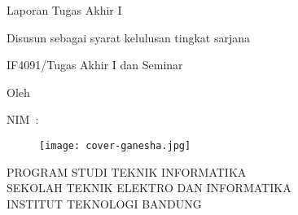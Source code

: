 
\begin{center}
    \smallskip
    \thispagestyle{empty}
    \Large \bfseries \MakeUppercase{\thetitle}
    \vfill

    \Large Laporan Tugas Akhir I
    \vfill

    \normalsize Disusun sebagai syarat kelulusan tingkat sarjana

    \normalsize IF4091/Tugas Akhir I dan Seminar
    \vfill

    \large Oleh

    \Large \uppercase{\theauthor}
    
    \Large NIM~:~\uppercase{\nim}

    \vfill
    \begin{figure}[h]
        \centering
      	\texttt{[image: cover-ganesha.jpg]}
    \end{figure}
    \vfill

    \large
    \uppercase{Program Studi Teknik Informatika \\
        Sekolah Teknik Elektro dan Informatika \\
        Institut Teknologi Bandung} \\
    \MakeUppercase{\monthyear}
    
\end{center}